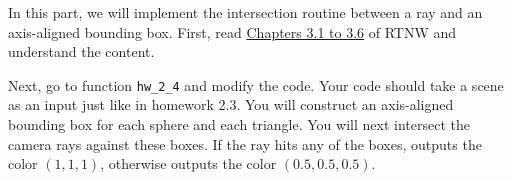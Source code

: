 In this part, we will implement the intersection routine between a ray and an axis-aligned bounding box. First, read \href{https://raytracing.github.io/books/RayTracingTheNextWeek.html#boundingvolumehierarchies}{Chapters 3.1 to 3.6} of RTNW and understand the content.

Next, go to function \lstinline{hw_2_4} and modify the code. Your code should take a scene as an input just like in homework 2.3. You will construct an axis-aligned bounding box for each sphere and each triangle. You will next intersect the camera rays against these boxes. If the ray hits any of the boxes, outputs the color $(1, 1, 1)$, otherwise outputs the color $(0.5, 0.5, 0.5)$.

%
%



